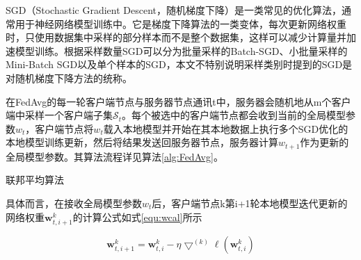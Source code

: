 SGD（Stochastic Gradient Descent，随机梯度下降）是一类常见的优化算法，通常用于神经网络模型训练中。它是梯度下降算法的一类变体，每次更新网络权重时，只使用数据集中采样的部分样本而不是整个数据集，这样可以减少计算量并加速模型训练。根据采样数量SGD可以分为批量采样的Batch-SGD、小批量采样的Mini-Batch SGD以及单个样本的SGD，本文不特别说明采样类别时提到的SGD是对随机梯度下降方法的统称。

在FedAvg的每一轮客户端节点与服务器节点通讯t中，服务器会随机地从m个客户端中采样一个客户端子集$\mathcal{S}_{t}$。每个被选中的客户端节点都会收到当前的全局模型参数$w_{t}$，客户端节点将$w_{t}$载入本地模型并开始在其本地数据上执行多个SGD优化的本地模型训练更新，然后将结果发送回服务器节点，服务器计算$w_{t+1}$作为更新的全局模型参数。其算法流程详见算法\ref{alg:FedAvg}。

\begin{algorithm}[H]
  \SetAlgoLined
 
  
  \caption{联邦平均算法}\label{alg:FedAvg}
 \end{algorithm}

具体而言，在接收全局模型参数$w_{t}$后，客户端节点k第i+1轮本地模型迭代更新的网络权重$\boldsymbol{w}^{k}_{t, i+1}$的计算公式如式\ref{equ:wcal}所示

\begin{equation}\label{equ:wcal}
  \boldsymbol{w}^{k}_{t, i+1}=\boldsymbol{w}^{k}_{t,i}-\eta \bigtriangledown^{(k)} \ell\left(\boldsymbol{w}^{k}_{t,i}\right)
\end{equation}


